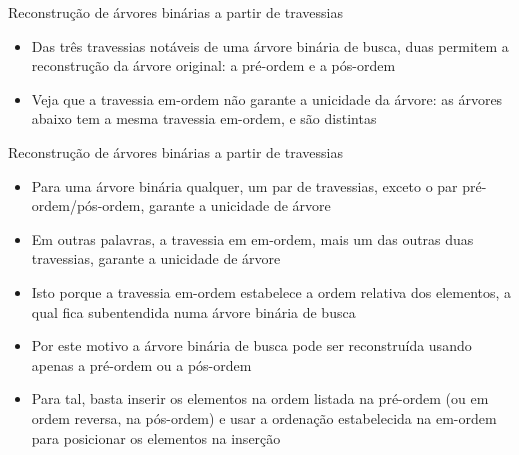 \begin{frame}[fragile]{Reconstrução de árvores binárias a partir de travessias}

    \begin{itemize}
        \item Das três  travessias notáveis de uma árvore binária de busca, duas permitem
            a reconstrução da árvore original: a pré-ordem e a pós-ordem

        \item Veja que a travessia em-ordem não garante a unicidade da árvore: as árvores 
            abaixo tem a mesma travessia em-ordem, e são distintas
    \end{itemize}


\end{frame}

\begin{frame}[fragile]{Reconstrução de árvores binárias a partir de travessias}

    \begin{itemize}
        \item Para uma árvore binária qualquer, um par de travessias, exceto o par
            pré-ordem/pós-ordem, garante a unicidade de árvore

        \item Em outras palavras, a travessia em em-ordem, mais um das outras duas travessias,
            garante a unicidade de árvore

        \item Isto porque a travessia em-ordem estabelece a ordem relativa dos elementos, a qual
            fica subentendida numa árvore binária de busca

        \item Por este motivo a árvore binária de busca pode ser reconstruída usando apenas a
            pré-ordem ou a pós-ordem

        \item Para tal, basta inserir os elementos na ordem listada na pré-ordem (ou em ordem
            reversa, na pós-ordem) e usar a ordenação estabelecida na em-ordem para posicionar
            os elementos na inserção
    \end{itemize}

\end{frame}

